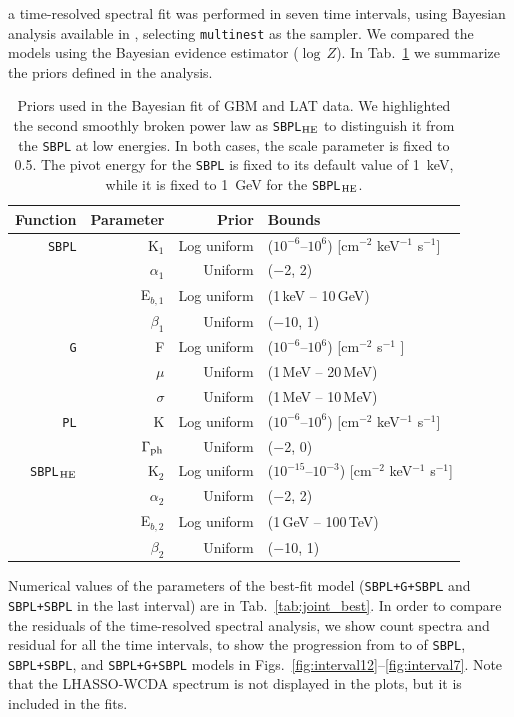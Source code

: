 \documentclass[preprint]{aastex631}
\begin{document}
 a time-resolved spectral fit was performed in seven time intervals, using Bayesian analysis available in \ThreeML, selecting \texttt{multinest} as the sampler. We compared the models using the Bayesian evidence estimator ($\log\,Z$). 
In Tab.~\ref{tab:priors} we summarize the priors defined in the analysis.

\begin{table}[h!]
    \centering
    \begin{tabular}{rr|rl}
        \hline
        Function & Parameter   & Prior & Bounds \\
        \hline
         \texttt{SBPL} & K$_1$      & Log uniform & ($10^{-6}$--$10^{6}$) [cm$^{-2}$ keV$^{-1}$ s$^{-1}$] \\
         & $\alpha_1$   & Uniform & ($-$2, 2)\\
         & E$_{b,1}$      & Log uniform & (1\,keV -- 10\,GeV) \\
         & $\beta_1$    & Uniform & ($-$10, 1)\\
         \hline
         \texttt{G} & F          & Log uniform & ($10^{-6}$--$10^{6}$) [cm$^{-2}$ s$^{-1}$ ] \\
         & $\mu$      & Uniform & (1\,MeV -- 20\,MeV)\\
         & $\sigma$   & Uniform & (1\,MeV -- 10\,MeV)\\
         \hline
         \texttt{PL} & K      & Log uniform & ($10^{-6}$--$10^{6}$) [cm$^{-2}$ keV$^{-1}$ s$^{-1}$] \\
         & $\Gamma_{\rm ph}$   & Uniform & ($-$2, 0)\\
        \hline
        \texttt{SBPL$_{\rm HE}$} & K$_2$      & Log uniform & ($10^{-15}$--$10^{-3}$) [cm$^{-2}$ keV$^{-1}$ s$^{-1}$] \\
         & $\alpha_2$   & Uniform & ($-$2, 2)\\
         & E$_{b,2}$      & Log uniform & (1\,GeV -- 100\,TeV) \\
         & $\beta_2$    & Uniform & ($-$10, 1)\\
         \hline

    \end{tabular}
    \caption{Priors used in the Bayesian fit of GBM and LAT data. We highlighted the second smoothly broken power law as \texttt{SBPL$_{\rm HE}$} to distinguish it from the \texttt{SBPL} at low energies. In both cases, the scale parameter is fixed to 0.5. The pivot energy for the \texttt{SBPL}  is fixed to its default value of 1~keV, while it is fixed to 1~GeV for the \texttt{SBPL$_{\rm HE}$}.}
    \label{tab:priors}
\end{table}
Numerical values of the parameters of the best-fit model (\texttt{SBPL+G+SBPL} and \texttt{SBPL+SBPL} in the last interval) are in Tab.~\ref{tab:joint_best}. 
In order to compare the residuals of the time-resolved spectral analysis, we show count spectra and residual for all the time intervals, to show the progression from  to  of \texttt{SBPL}, \texttt{SBPL+SBPL}, and \texttt{SBPL+G+SBPL} models in Figs.~\ref{fig:interval12}--\ref{fig:interval7}. 
Note that the LHASSO-WCDA spectrum is not displayed in the plots, but it is included in the fits.
\end{document}
